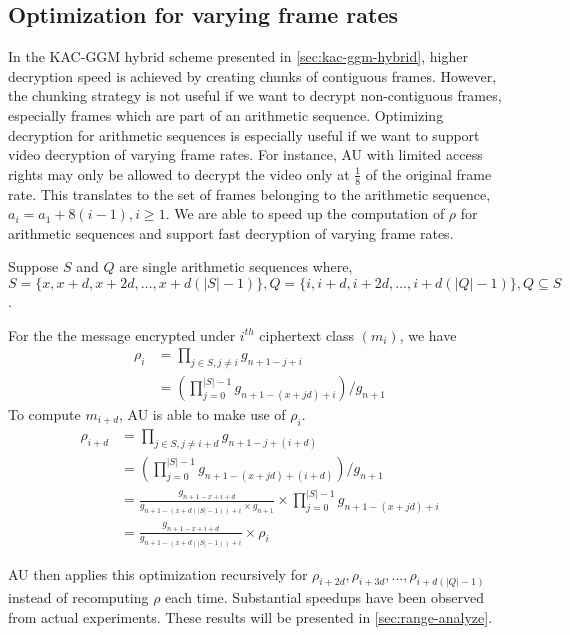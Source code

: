 \documentclass[hyp,a4paper,12pt,openbib]{socreport}
\begin{document}
\subsection{Optimization for varying frame rates}
\label{sec:kac-arithmetic}
In the KAC-GGM hybrid scheme presented in \cref{sec:kac-ggm-hybrid}, higher decryption speed is achieved by creating chunks of contiguous frames. However, the chunking strategy is not useful if we want to decrypt non-contiguous frames, especially frames which are part of an arithmetic sequence. Optimizing decryption for arithmetic sequences is especially useful if we want to support video decryption of varying frame rates. For instance, AU with limited access rights may only be allowed to decrypt the video only at $\frac{1}{8}$ of the original frame rate. This translates to the set of frames belonging to the arithmetic sequence, $a_i = a_1 + 8(i-1), i \geq 1$. We are able to speed up the computation of $\rho$ for arithmetic sequences and support fast decryption of varying frame rates.


Suppose $S$ and $Q$ are single arithmetic sequences where, ${S} = \{x, x+d, x+2d, \dots, x+d(|S|-1)\}, Q= \{i, i+d, i+2d, \dots, i+d(|Q|-1) \}, Q \subseteq {S}$.

For the the message encrypted under $i^{th}$ ciphertext class $(m_i)$, we have 
\begin{align*}
\displaystyle
\rho_{i} &= \prod_{j \in S, j \neq i } g_{n+1-j+i}\\
	&=(\prod^{|S|-1}_{j=0} g_{n+1-(x+jd)+i} )/ g_{n+1}
\end{align*}
To compute $m_{i+d}$, AU is able to make use of $\rho_i$.
\begin{align*}
\rho_{i+d} &= \prod_{j \in S, j \neq i+d } g_{n+1-j+(i+d)}\\
	&= (\prod^{|S|-1}_{j=0} g_{n+1-(x+jd)+(i+d)} )/ g_{n+1} \\
	&= \frac{g_{n+1-x + i + d} }{ g_{n+1-(x+d(|S|-1))+i}  \times g_{n+1}} \times \prod^{|S|-1}_{j=0} g_{n+1-(x+jd)+i}  \\
	&=  \frac{g_{n+1-x + i + d} }{ g_{n+1-(x+d(|S|-1))+i}} \times \rho_{i}
\end{align*}

AU then applies this optimization recursively for $\rho_{i+2d}, \rho_{i+3d}, \dots, \rho_{i+d(|Q|-1)}$ instead of recomputing $\rho$ each time. Substantial speedups have been observed from actual experiments. These results will be presented in \cref{sec:range-analyze}. 
\end{document}
